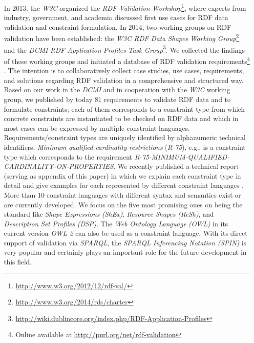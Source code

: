 \documentclass[a4paper,fontsize=11pt]{scrartcl}
\begin{document}
In 2013, the \emph{W3C} organized the \emph{RDF Validation Workshop}\footnote{\url{http://www.w3.org/2012/12/rdf-val/}}, 
where experts from industry, government, and academia discussed first use cases for RDF data validation and constraint formulation.
In 2014, two working groups on RDF validation have been established: 
the \emph{W3C RDF Data Shapes Working Group}\footnote{\url{http://www.w3.org/2014/rds/charter}} and the \emph{DCMI RDF Application Profiles Task Group}\footnote{\url{http://wiki.dublincore.org/index.php/RDF-Application-Profiles}}. 
We collected the findings of these working groups and initiated a database of RDF validation requirements\footnote{Online available at \url{http://purl.org/net/rdf-validation}} \cite{BoschEckert2014}.
The intention is to collaboratively collect case studies, use cases, requirements, and solutions regarding RDF validation in a comprehensive and structured way. 
Based on our work in the \emph{DCMI} and in cooperation with the \emph{W3C} working group,
we published by today 81 requirements to validate RDF data and to formulate constraints; 
each of them corresponds to a constraint type from which concrete constraints are instantiated to be checked on RDF data and
which in most cases can be expressed by multiple constraint languages.
Requirements/constraint types are uniquely identified by alphanumeric technical identifiers.
\emph{Minimum qualified cardinality restrictions} (\emph{R-75}), e.g., is a constraint type which corresponds to the requirement {\small\emph{R-75-MINIMUM-QUALIFIED-CARDINALITY-ON-PROPERTIES}}.
We recently published a technical report (serving as appendix of this paper) in which we explain each constraint type in detail and give examples for each represented by different constraint languages \cite{BoschNolleAcarEckert2015}.
More than 10 constraint languages with different syntax and semantics exist or are currently developed. 
We focus on the five most promising ones on being the standard like
\emph{Shape Expressions (ShEx)}, \emph{Resource Shapes (ReSh)}, and \emph{Description Set Profiles (DSP)}. 
The \emph{Web Ontology Language} \emph{(OWL)} in its current version \emph{OWL 2} can also be used as a constraint language.
With its direct support of validation via \emph{SPARQL}, the \emph{SPARQL Inferencing Notation (SPIN)} is very popular and certainly plays an important role for the future development in this field. 
\end{document}
